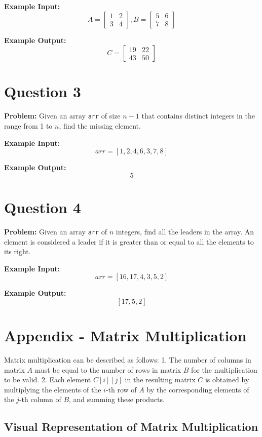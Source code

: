 \documentclass[12pt]{article}
\begin{document}
\textbf{Example Input:}
\[
A = \begin{bmatrix}
1 & 2 \\
3 & 4
\end{bmatrix},
B = \begin{bmatrix}
5 & 6 \\
7 & 8
\end{bmatrix}
\]

\textbf{Example Output:}
\[
C = \begin{bmatrix}
19 & 22 \\
43 & 50
\end{bmatrix}
\]

\section*{Question 3}
\textbf{Problem:} Given an array \texttt{arr} of size \(n-1\) that contains distinct integers in the range from 1 to \(n\), find the missing element.

\textbf{Example Input:}
\[
arr = [1, 2, 4, 6, 3, 7, 8]
\]

\textbf{Example Output:}
\[
5
\]


\section*{Question 4}
\textbf{Problem:} Given an array \texttt{arr} of \(n\) integers, find all the leaders in the array. An element is considered a leader if it is greater than or equal to all the elements to its right.

\textbf{Example Input:}
\[
arr = [16, 17, 4, 3, 5, 2]
\]

\textbf{Example Output:}
\[
[17, 5, 2]
\]


\appendix

\section{Appendix - Matrix Multiplication}

Matrix multiplication can be described as follows:
1. The number of columns in matrix \(A\) must be equal to the number of rows in matrix \(B\) for the multiplication to be valid.
2. Each element \(C[i][j]\) in the resulting matrix \(C\) is obtained by multiplying the elements of the \(i\)-th row of \(A\) by the corresponding elements of the \(j\)-th column of \(B\), and summing these products.

\subsection{Visual Representation of Matrix Multiplication}
\end{document}
